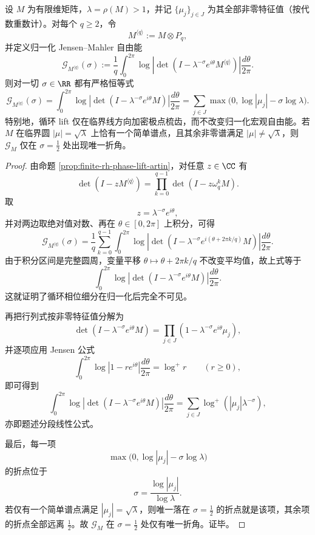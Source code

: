 \begin{theorem}[循环相位细分的归一化自由能不可见性]\label{thm:conclusion-cyclic-lift-normalized-freeenergy-invisibility}
设 \(M\) 为有限维矩阵，\(\lambda=\rho(M)>1\)，并记 \(\{\mu_j\}_{j\in J}\) 为其全部非零特征值（按代数重数计）。对每个 \(q\ge 2\)，令
\[
M^{\langle q\rangle}:=M\otimes P_q,
\]
并定义归一化 Jensen--Mahler 自由能
\[
\mathcal G_{M^{\langle q\rangle}}(\sigma)
:=
\frac1q\int_0^{2\pi}
\log\left|\det\!\left(I-\lambda^{-\sigma}e^{i\theta}M^{\langle q\rangle}\right)\right|
\frac{d\theta}{2\pi}.
\]
则对一切 \(\sigma\in\RR\) 都有严格恒等式
\[
\mathcal G_{M^{\langle q\rangle}}(\sigma)
=
\int_0^{2\pi}
\log\left|\det\!\left(I-\lambda^{-\sigma}e^{i\theta}M\right)\right|
\frac{d\theta}{2\pi}
=
\sum_{j\in J}\max\!\bigl(0,\log|\mu_j|-\sigma\log\lambda\bigr).
\]
特别地，循环 lift 仅在临界线方向加密极点梳齿，而不改变归一化宏观自由能。若 \(M\) 在临界圆 \(|\mu|=\sqrt{\lambda}\) 上恰有一个简单谱点，且其余非零谱满足 \(|\mu|\neq \sqrt{\lambda}\)，则 \(\mathcal G_M\) 仅在 \(\sigma=\frac12\) 处出现唯一折角。
\end{theorem}
\begin{proof}
由命题 \ref{prop:finite-rh-phase-lift-artin}，对任意 \(z\in\CC\) 有
\[
\det(I-zM^{\langle q\rangle})
=
\prod_{k=0}^{q-1}\det(I-z\omega_q^k M).
\]
取
\[
z=\lambda^{-\sigma}e^{i\theta},
\]
并对两边取绝对值对数、再在 \(\theta\in[0,2\pi]\) 上积分，可得
\[
\mathcal G_{M^{\langle q\rangle}}(\sigma)
=
\frac1q\sum_{k=0}^{q-1}
\int_0^{2\pi}
\log\left|\det\!\left(I-\lambda^{-\sigma}e^{i(\theta+2\pi k/q)}M\right)\right|
\frac{d\theta}{2\pi}.
\]
由于积分区间是完整圆周，变量平移 \(\theta\mapsto \theta+2\pi k/q\) 不改变平均值，故上式等于
\[
\int_0^{2\pi}
\log\left|\det\!\left(I-\lambda^{-\sigma}e^{i\theta}M\right)\right|
\frac{d\theta}{2\pi}.
\]
这就证明了循环相位细分在归一化后完全不可见。

再把行列式按非零特征值分解为
\[
\det\!\left(I-\lambda^{-\sigma}e^{i\theta}M\right)
=
\prod_{j\in J}\left(1-\lambda^{-\sigma}e^{i\theta}\mu_j\right),
\]
并逐项应用 Jensen 公式
\[
\int_0^{2\pi}\log|1-re^{i\theta}|\frac{d\theta}{2\pi}=\log^+ r
\qquad (r\ge 0),
\]
即可得到
\[
\int_0^{2\pi}
\log\left|\det\!\left(I-\lambda^{-\sigma}e^{i\theta}M\right)\right|
\frac{d\theta}{2\pi}
=
\sum_{j\in J}\log^+\!\left(|\mu_j|\lambda^{-\sigma}\right),
\]
亦即题述分段线性公式。

最后，每一项
\[
\max\!\bigl(0,\log|\mu_j|-\sigma\log\lambda\bigr)
\]
的折点位于
\[
\sigma=\frac{\log|\mu_j|}{\log\lambda}.
\]
若仅有一个简单谱点满足 \(|\mu_j|=\sqrt{\lambda}\)，则唯一落在 \(\sigma=\frac12\) 的折点就是该项，其余项的折点全部远离 \(\frac12\)。故 \(\mathcal G_M\) 在 \(\sigma=\frac12\) 处仅有唯一折角。证毕。
\end{proof}

